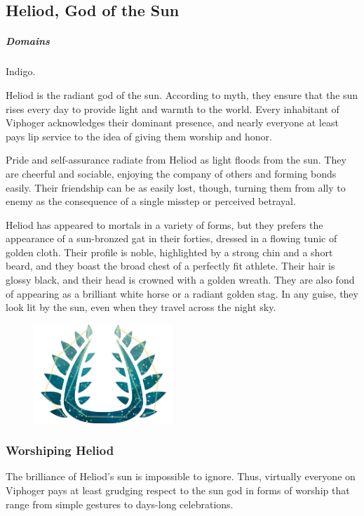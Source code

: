\subsection*{Heliod, God of the Sun} \label{ssec::heliod}
    \subparagraph{Domains} Indigo.

    Heliod is the radiant god of the sun.
    According to myth, they ensure that the sun rises every day to provide light and warmth to the world.
    Every inhabitant of Viphoger acknowledges their dominant presence, and nearly everyone at least pays lip service to the idea of giving them worship and honor.

    Pride and self-assurance radiate from Heliod as light floods from the sun.
    They are cheerful and sociable, enjoying the company of others and forming bonds easily.
    Their friendship can be as easily lost, though, turning them from ally to enemy as the consequence of a single misstep or perceived betrayal.

    Heliod has appeared to mortals in a variety of forms, but they prefers the appearance of a sun-bronzed gat in their forties, dressed in a flowing tunic of golden cloth.
    Their profile is noble, highlighted by a strong chin and a short beard, and they boast the broad chest of a perfectly fit athlete.
    Their hair is glossy black, and their head is crowned with a golden wreath.
    They are also fond of appearing as a brilliant white horse or a radiant golden stag.
    In any guise, they look lit by the sun, even when they travel across the night sky.

    \begin{figure}[t]
        \centering
        \includegraphics[width=0.47\textwidth]{02viphoger/img/10s_heliod.png}
    \end{figure}

    \subsubsection{Worshiping Heliod}
        The brilliance of Heliod's sun is impossible to ignore.
        Thus, virtually everyone on Viphoger pays at least grudging respect to the sun god in forms of worship that range from simple gestures to days-long celebrations.

